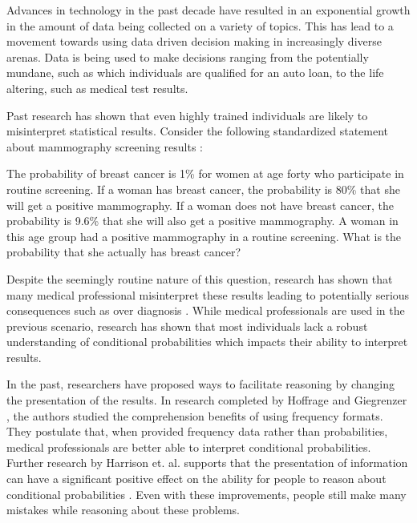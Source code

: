 
Advances in technology in the past decade have resulted in an exponential
growth in the amount of data being collected on a variety of topics. This has
lead to a movement towards using data driven decision making in increasingly
diverse arenas. Data is being used to make decisions ranging from the
potentially mundane, such as which individuals are qualified for an auto
loan, to the life altering, such as medical test results.

Past research has shown that even highly trained individuals are likely to
misinterpret statistical results. Consider the following standardized
statement about mammography screening results \cite{Ottley2016}:

\begin{displayquote}
    The probability of breast cancer is 1\% for women at age forty who participate
    in routine screening. If a woman has breast cancer, the probability is 80\%
    that she will get a positive mammography. If a woman does not have breast
    cancer, the probability is 9.6\% that she will also get a positive
    mammography. A woman in this age group had a positive mammography in a
    routine screening. What is the probability that she actually has breast
    cancer? 
\end{displayquote}

Despite the seemingly routine nature of this question, research has shown
that many medical professional misinterpret these results leading to
potentially serious consequences such as over diagnosis \cite{Friederichs2014, Welch2010}. While
medical professionals are used in the previous scenario, research has shown
that most individuals lack a robust understanding of conditional
probabilities which impacts their ability to interpret results.

In the past, researchers have proposed ways to facilitate reasoning by
changing the presentation of the results. In research completed by Hoffrage
and Giegrenzer \cite{Gigerenzer1995}, the authors studied the comprehension benefits of
using frequency formats. They postulate that, when provided frequency data
rather than probabilities, medical professionals are better able to interpret
conditional probabilities. Further research by Harrison et. al. supports that
the presentation of information can have a significant positive effect on the
ability for people to reason about conditional probabilities \cite{Ottley2016}. Even with
these improvements, people still make many mistakes while reasoning about
these problems.

